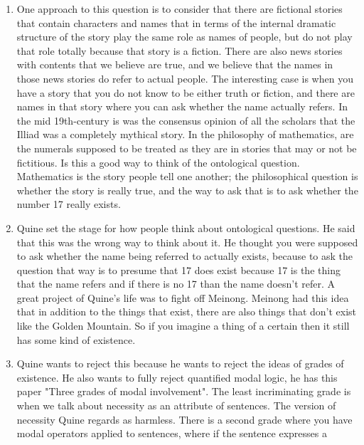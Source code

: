 \documentclass[12pt]{article}
\theoremstyle{definition}
\begin{document}
\begin{enumerate}
    \item
        One approach to this question is to consider that there are fictional
        stories that contain characters and names that in terms of the internal
        dramatic structure of the story play the same role as names of people,
        but do not play that role totally because that story is a fiction.
        There are also news stories with contents that we believe are true, and
        we believe that the names in those news stories do refer to actual
        people. The interesting case is when you have a story that you do not
        know to be either truth or fiction, and there are names in that story
        where you can ask whether the name actually refers. In the mid
        19th-century is was the consensus opinion of all the scholars that the
        Illiad was a completely mythical story. In the philosophy of
        mathematics, are the numerals supposed to be treated as they are in
        stories that may or not be fictitious. Is this a good way to think of
        the ontological question. Mathematics is the story people tell one
        another; the philosophical question is whether the story is really
        true, and the way to ask that is to ask whether the number 17 really
        exists. 
    \item
        Quine set the stage for how people think about ontological questions.
        He said that this was the wrong way to think about it. He thought you
        were supposed to ask whether the name being referred to actually
        exists, because to ask the question that way is to presume that 17 does
        exist because 17 is the thing that the name refers and if there is no
        17 than the name doesn't refer. A great project of Quine's life was to
        fight off Meinong. Meinong had this idea that in addition to the things
        that exist, there are also things that don't exist like the Golden
        Mountain. So if you imagine a thing of a certain then it still has some
        kind of existence. 
    \item
        Quine wants to reject this because he wants to
        reject the ideas of grades of existence. He also wants to fully reject
        quantified modal logic, he has this paper "Three grades of modal
        involvement". The least incriminating grade is when we talk about
        necessity as an attribute of sentences. The version of necessity Quine
        regards as harmless. There is a second grade where you have modal
        operators applied to sentences, where if the sentence expresses a

\end{enumerate}
\end{document}
